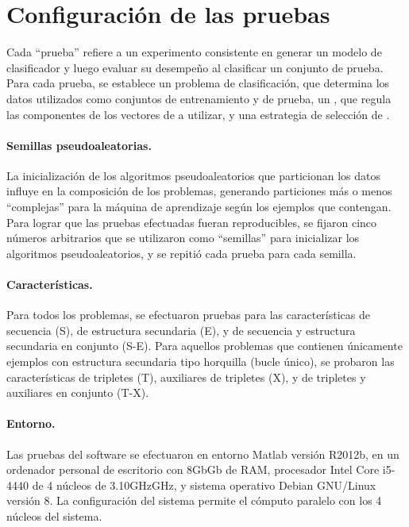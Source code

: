%
%
%
\section{Configuración de las pruebas}
%
Cada ``prueba'' refiere a un experimento consistente en generar un
modelo de clasificador y luego evaluar su desempeño al clasificar
un conjunto de prueba.
Para cada prueba, se establece un {problema} de clasificación, que
determina los datos utilizados como conjuntos de entrenamiento y de
prueba, un , que regula las componentes de
los vectores de  a utilizar, y una estrategia de selección
de .

\paragraph{Semillas pseudoaleatorias.}
La inicialización de los algoritmos pseudoaleatorios que particionan
los datos influye en la composición de los problemas,
generando particiones más o menos ``complejas'' para la máquina
de aprendizaje según los ejemplos que contengan.
Para lograr que las pruebas efectuadas fueran reproducibles, se
fijaron cinco números arbitrarios que se utilizaron como ``semillas''
para inicializar los algoritmos pseudoaleatorios, y se repitió cada
prueba para cada semilla.

\paragraph{Características.}
Para todos los problemas, se efectuaron pruebas para las
características de secuencia (S), de estructura secundaria (E), y de
secuencia y estructura secundaria en conjunto (S-E).
Para aquellos problemas que contienen únicamente ejemplos con
estructura secundaria tipo horquilla (bucle único), se probaron las
características de tripletes (T), auxiliares de tripletes (X), y de
tripletes y auxiliares en conjunto (T-X).

\paragraph{Entorno.}
Las pruebas del software se efectuaron en entorno Matlab versión
R2012b, en un ordenador personal de escritorio con 8\iflatexml{}Gb\else\si{\giga b}\fi{} de
RAM, procesador Intel Core i5-4440 de 4 núcleos de 3.10\iflatexml{}GHz\else\si{\giga Hz}\fi{},
y sistema operativo Debian GNU/Linux versión 8.
La configuración del sistema permite el cómputo paralelo con los 4
núcleos del sistema.

